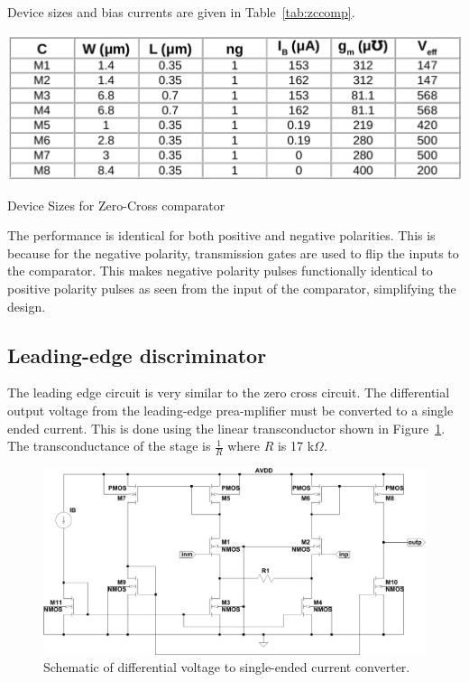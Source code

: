 \documentclass[12pt,oneside,final]{siuethesis}
\theoremstyle{definition}
\begin{document}
Device sizes and bias currents are given in Table~\ref{tab:zccomp}.

 \begin{table}[htbp!]
 \centering
 \includegraphics[scale=.35,keepaspectratio=true]{./ch3_figures/zc_cmp_sizes.png}
 \caption{Device Sizes for Zero-Cross comparator}
 \label{tab:zccomp}
\end{table}
\par The performance is identical for both positive and negative polarities. This is because for the negative polarity, transmission gates are used to flip the inputs to the comparator. This makes negative polarity pulses functionally identical to positive polarity pulses as seen from the input of the comparator, simplifying the design.

\subsection{Leading-edge discriminator}
\par The leading edge circuit is very similar to the zero cross circuit. The differential output voltage from the leading-edge prea-mplifier must be converted to a single ended current. This is done using the linear transconductor shown in Figure~\ref{FIG:LE_GM}.  The transconductance of the stage is $\frac{1}{R}$ where $R$ is 17 k$\Omega$.

\begin{figure}[htbp!]
	\centering
 	\includegraphics[scale=0.55,keepaspectratio=true]{../Design_Reports/CFD_circuit_report/images/le_gm.pdf}
 	\caption{Schematic of differential voltage to single-ended current converter.}
 	\label{FIG:LE_GM}
\end{figure}
\end{document}
